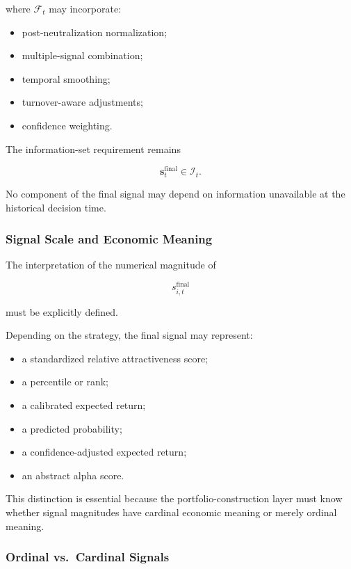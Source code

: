 \documentclass[11pt,a4paper]{article}
\begin{document}
where $\mathcal{F}_t$ may incorporate:

\begin{itemize}
    \item post-neutralization normalization;
    \item multiple-signal combination;
    \item temporal smoothing;
    \item turnover-aware adjustments;
    \item confidence weighting.
\end{itemize}

The information-set requirement remains

\begin{equation}
\boxed{
\mathbf{s}_t^{\mathrm{final}}
\in
\mathcal{I}_t.
}
\end{equation}

No component of the final signal may depend on information unavailable at the
historical decision time.


\subsubsection{Signal Scale and Economic Meaning}

The interpretation of the numerical magnitude of

\begin{equation}
s_{i,t}^{\mathrm{final}}
\end{equation}

must be explicitly defined.

Depending on the strategy, the final signal may represent:

\begin{itemize}
    \item a standardized relative attractiveness score;
    \item a percentile or rank;
    \item a calibrated expected return;
    \item a predicted probability;
    \item a confidence-adjusted expected return;
    \item an abstract alpha score.
\end{itemize}

This distinction is essential because the portfolio-construction layer must know
whether signal magnitudes have cardinal economic meaning or merely ordinal
meaning.


\subsubsection{Ordinal vs.\ Cardinal Signals}
\end{document}
